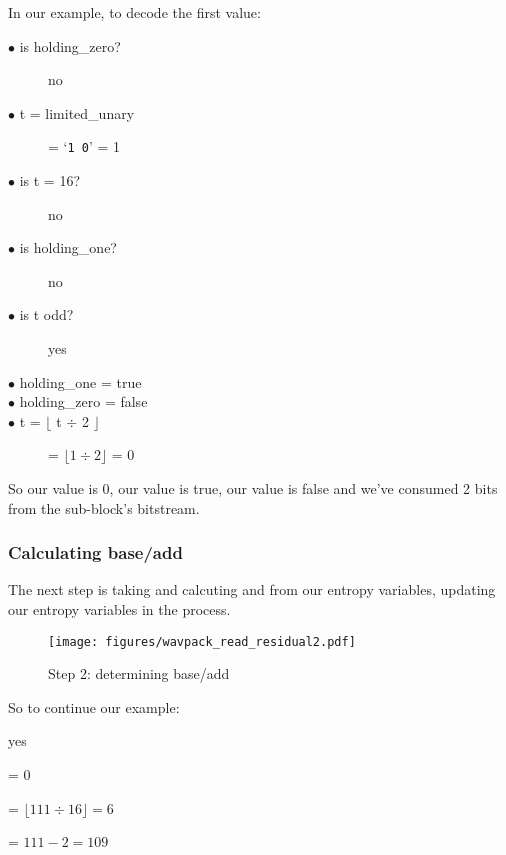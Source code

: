 In our example, to decode the first  value:
\begin{description}
\item[$\bullet$ is holding\_zero?] no
\item[$\bullet$ t = limited\_unary] = `\texttt{1 0}' = 1
\item[$\bullet$ is t = 16?] no
\item[$\bullet$ is holding\_one?] no
\item[$\bullet$ is t odd?] yes
\item[$\bullet$ holding\_one = true]
\item[$\bullet$ holding\_zero = false]
\item[$\bullet$ t = $\lfloor$ t $\div$ 2 $\rfloor$] = $\lfloor 1 \div 2 \rfloor$ = 0
\end{description}
So our  value is 0, our  value is true,
our  value is false and we've
consumed 2 bits from the sub-block's bitstream.

\clearpage

\subsubsection{Calculating base/add}
The next step is taking  and calcuting  and 
from our entropy variables, updating our entropy variables in the process.
\begin{figure}[h]
\texttt{[image: figures/wavpack\_read\_residual2.pdf]}
\caption{Step 2: determining base/add}
\end{figure}
\par
\noindent
So to continue our example:
\begin{description}
\setlength{\itemsep}{0pt}
\item[$\bullet$ is t = 0?] yes
\item[$\bullet$ base] = 0
\item[$\bullet$ add = $\lfloor \text{Entropy}_1 \div 16 \rfloor$] = $\lfloor 111 \div 16 \rfloor = 6$
\item[$\bullet$ $\text{Entropy}_1$ = $\text{Entropy}_1 - \lfloor(\text{Entropy}_1 + 126) \div 128\rfloor \times 2$] = $111 - 2 = 109$
\end{description}

\clearpage

